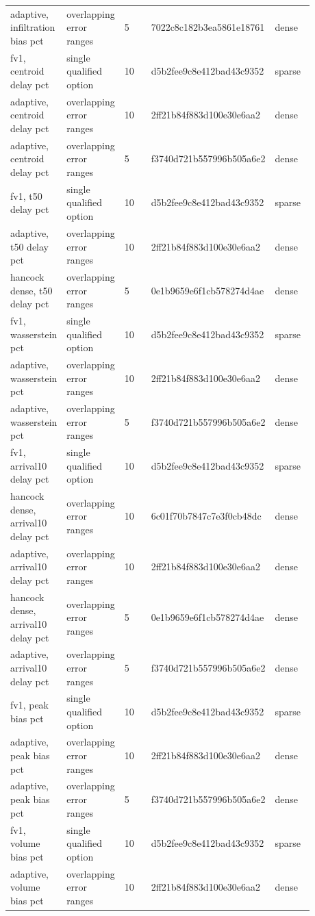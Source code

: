 \begin{longtable}{p{0.1760\linewidth}p{0.1760\linewidth}p{0.1760\linewidth}p{0.1760\linewidth}p{0.1760\linewidth}}
adaptive, infiltration bias pct & overlapping error ranges & 5 & 7022c8c182b3ea5861e18761 & dense \\
fv1, centroid delay pct & single qualified option & 10 & d5b2fee9c8e412bad43c9352 & sparse \\
adaptive, centroid delay pct & overlapping error ranges & 10 & 2ff21b84f883d100e30e6aa2 & dense \\
adaptive, centroid delay pct & overlapping error ranges & 5 & f3740d721b557996b505a6e2 & dense \\
fv1, t50 delay pct & single qualified option & 10 & d5b2fee9c8e412bad43c9352 & sparse \\
adaptive, t50 delay pct & overlapping error ranges & 10 & 2ff21b84f883d100e30e6aa2 & dense \\
hancock dense, t50 delay pct & overlapping error ranges & 5 & 0e1b9659e6f1cb578274d4ae & dense \\
fv1, wasserstein pct & single qualified option & 10 & d5b2fee9c8e412bad43c9352 & sparse \\
adaptive, wasserstein pct & overlapping error ranges & 10 & 2ff21b84f883d100e30e6aa2 & dense \\
adaptive, wasserstein pct & overlapping error ranges & 5 & f3740d721b557996b505a6e2 & dense \\
fv1, arrival10 delay pct & single qualified option & 10 & d5b2fee9c8e412bad43c9352 & sparse \\
hancock dense, arrival10 delay pct & overlapping error ranges & 10 & 6c01f70b7847c7e3f0cb48dc & dense \\
adaptive, arrival10 delay pct & overlapping error ranges & 10 & 2ff21b84f883d100e30e6aa2 & dense \\
hancock dense, arrival10 delay pct & overlapping error ranges & 5 & 0e1b9659e6f1cb578274d4ae & dense \\
adaptive, arrival10 delay pct & overlapping error ranges & 5 & f3740d721b557996b505a6e2 & dense \\
fv1, peak bias pct & single qualified option & 10 & d5b2fee9c8e412bad43c9352 & sparse \\
adaptive, peak bias pct & overlapping error ranges & 10 & 2ff21b84f883d100e30e6aa2 & dense \\
adaptive, peak bias pct & overlapping error ranges & 5 & f3740d721b557996b505a6e2 & dense \\
fv1, volume bias pct & single qualified option & 10 & d5b2fee9c8e412bad43c9352 & sparse \\
adaptive, volume bias pct & overlapping error ranges & 10 & 2ff21b84f883d100e30e6aa2 & dense \\

\end{longtable}
